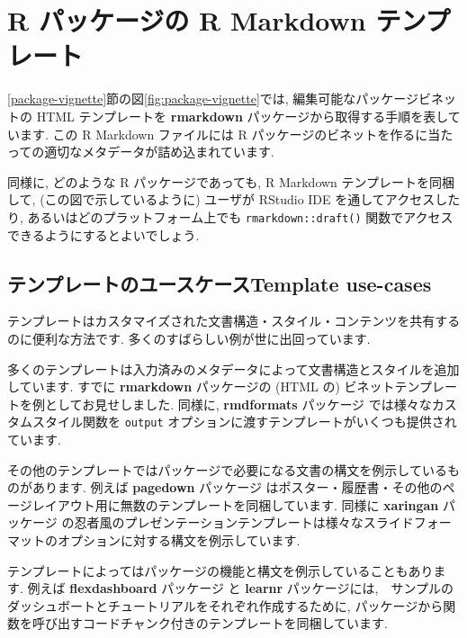 \documentclass[
  11pt,
  lualatex,ja=standard,jafont=noto]{bxjsreport}
\begin{document}
\hypertarget{package-template}{%
\section{R パッケージの R Markdown テンプレート}\label{package-template}}

\ref{package-vignette}節の図\ref{fig:package-vignette}では, 編集可能なパッケージビネットの HTML テンプレートを \textbf{rmarkdown} パッケージから取得する手順を表しています. この R Markdown ファイルには R パッケージのビネットを作るに当たっての適切なメタデータが詰め込まれています.

同様に, どのような R パッケージであっても, R Markdown テンプレートを同梱して, (この図で示しているように) ユーザが RStudio IDE を通してアクセスしたり, あるいはどのプラットフォーム上でも \texttt{rmarkdown::draft()} 関数でアクセスできるようにするとよいでしょう.

\hypertarget{ux30c6ux30f3ux30d7ux30ecux30fcux30c8ux306eux30e6ux30fcux30b9ux30b1ux30fcux30b9template-use-cases}{%
\subsection{テンプレートのユースケースTemplate use-cases}\label{ux30c6ux30f3ux30d7ux30ecux30fcux30c8ux306eux30e6ux30fcux30b9ux30b1ux30fcux30b9template-use-cases}}

テンプレートはカスタマイズされた文書構造・スタイル・コンテンツを共有するのに便利な方法です. 多くのすばらしい例が世に出回っています.

多くのテンプレートは入力済みのメタデータによって文書構造とスタイルを追加しています. すでに \textbf{rmarkdown} パッケージの (HTML の) ビネットテンプレートを例としてお見せしました. 同様に, \textbf{rmdformats} パッケージ \autocite{R-rmdformats} では様々なカスタムスタイル関数を \texttt{output} オプションに渡すテンプレートがいくつも提供されています.

その他のテンプレートではパッケージで必要になる文書の構文を例示しているものがあります. 例えば \textbf{pagedown} パッケージ \autocite{R-pagedown} はポスター・履歴書・その他のページレイアウト用に無数のテンプレートを同梱しています. 同様に \textbf{xaringan} パッケージ \autocite{R-xaringan} の忍者風のプレゼンテーションテンプレートは様々なスライドフォーマットのオプションに対する構文を例示しています.

テンプレートによってはパッケージの機能と構文を例示していることもあります. 例えば \textbf{flexdashboard} パッケージ \autocite{R-flexdashboard} と \textbf{learnr} \autocite{R-learnr} パッケージには,　サンプルのダッシュボートとチュートリアルをそれぞれ作成するために, パッケージから関数を呼び出すコードチャンク付きのテンプレートを同梱しています.
\end{document}
